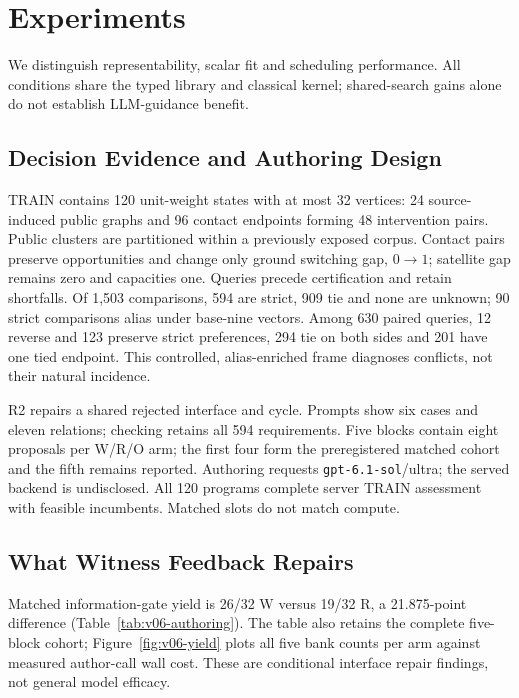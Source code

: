 \section{Experiments}
\label{sec:experiments}

We distinguish representability, scalar fit and scheduling performance.
All conditions share the typed library and classical kernel; shared-search
gains alone do not establish LLM-guidance benefit.

\subsection{Decision Evidence and Authoring Design}
TRAIN contains 120 unit-weight states with at most 32 vertices: 24
source-induced public graphs and 96 contact endpoints forming 48 intervention
pairs. Public clusters are partitioned within a previously exposed corpus.
Contact pairs preserve opportunities and change only ground switching gap,
$0\!\to\!1$; satellite gap remains zero and capacities one.
Queries precede certification and retain shortfalls. Of 1,503 comparisons,
594 are strict, 909 tie and none are unknown; 90 strict comparisons alias
under base-nine vectors. Among 630 paired queries, 12 reverse and 123
preserve strict preferences, 294 tie on both sides and 201 have one tied
endpoint. This controlled,
alias-enriched frame diagnoses conflicts, not their natural incidence.

R2 repairs a shared rejected interface and cycle. Prompts show six cases and
eleven relations; checking retains all 594 requirements. Five blocks contain
eight proposals per W/R/O arm; the first four form the preregistered matched
cohort and the fifth remains reported. Authoring requests
\texttt{gpt-6.1-sol}/ultra; the served backend is undisclosed.
All 120 programs complete server TRAIN assessment with feasible incumbents.
Matched slots do not match compute.

\subsection{What Witness Feedback Repairs}
Matched information-gate yield is 26/32 W versus 19/32 R, a 21.875-point
difference (Table~\ref{tab:v06-authoring}). The table also retains the complete
five-block cohort; Figure~\ref{fig:v06-yield} plots all five bank counts per
arm against measured author-call wall cost.
These are conditional interface repair findings, not general model efficacy.

